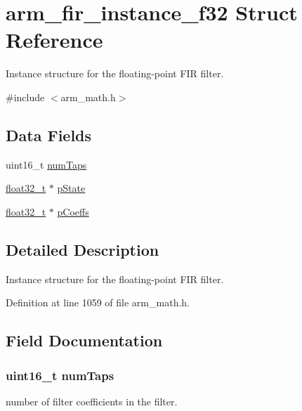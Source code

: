 \hypertarget{structarm__fir__instance__f32}{}\section{arm\+\_\+fir\+\_\+instance\+\_\+f32 Struct Reference}
\label{structarm__fir__instance__f32}


Instance structure for the floating-\/point F\+IR filter.  




{\ttfamily \#include $<$arm\+\_\+math.\+h$>$}

\subsection*{Data Fields}
\begin{DoxyCompactItemize}
\item 
uint16\+\_\+t \hyperlink{structarm__fir__instance__f32_a751941891e47f522a7f5375fe8990aac}{num\+Taps}
\item 
\hyperlink{arm__math_8h_a4611b605e45ab401f02cab15c5e38715}{float32\+\_\+t} $\ast$ \hyperlink{structarm__fir__instance__f32_a335c87e6fdc4b96601d95a5de8b9c463}{p\+State}
\item 
\hyperlink{arm__math_8h_a4611b605e45ab401f02cab15c5e38715}{float32\+\_\+t} $\ast$ \hyperlink{structarm__fir__instance__f32_aacbb8dd8eeba4b21fc2bb40076405ee3}{p\+Coeffs}
\end{DoxyCompactItemize}


\subsection{Detailed Description}
Instance structure for the floating-\/point F\+IR filter. 

Definition at line 1059 of file arm\+\_\+math.\+h.



\subsection{Field Documentation}
\subsubsection[{\texorpdfstring{num\+Taps}{numTaps}}]{\setlength{\rightskip}{0pt plus 5cm}uint16\+\_\+t num\+Taps}\hypertarget{structarm__fir__instance__f32_a751941891e47f522a7f5375fe8990aac}{}\label{structarm__fir__instance__f32_a751941891e47f522a7f5375fe8990aac}
number of filter coefficients in the filter. 

